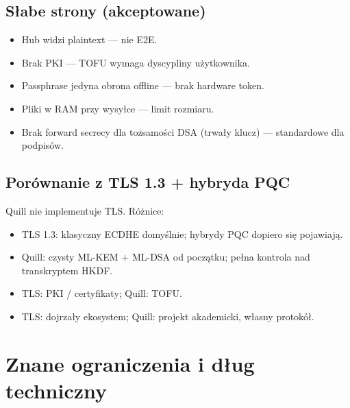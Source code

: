 \documentclass[12pt,a4paper]{article}
\begin{document}
\subsection{Słabe strony (akceptowane)}

\begin{itemize}
    \item Hub widzi plaintext --- nie E2E.
    \item Brak PKI --- TOFU wymaga dyscypliny użytkownika.
    \item Passphrase jedyna obrona offline --- brak hardware token.
    \item Pliki w RAM przy wysyłce --- limit rozmiaru.
    \item Brak forward secrecy dla tożsamości DSA (trwały klucz) --- standardowe dla podpisów.
\end{itemize}

\subsection{Porównanie z TLS 1.3 + hybryda PQC}

Quill nie implementuje TLS. Różnice:
\begin{itemize}
    \item TLS 1.3: klasyczny ECDHE domyślnie; hybrydy PQC dopiero się pojawiają.
    \item Quill: czysty ML-KEM + ML-DSA od początku; pełna kontrola nad transkryptem HKDF.
    \item TLS: PKI / certyfikaty; Quill: TOFU.
    \item TLS: dojrzały ekosystem; Quill: projekt akademicki, własny protokół.
\end{itemize}

\section{Znane ograniczenia i dług techniczny}
\end{document}
